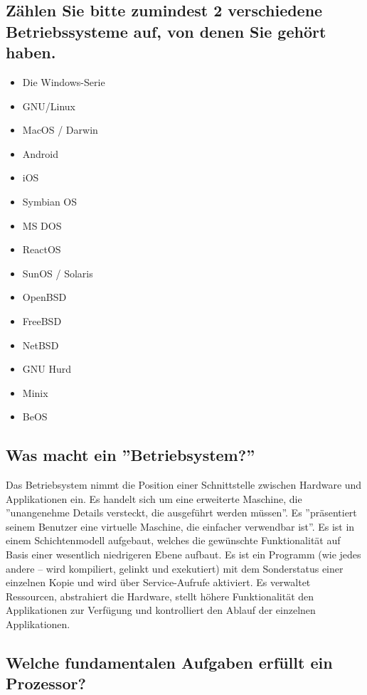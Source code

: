 \subsection{Zählen Sie bitte zumindest 2 verschiedene Betriebssysteme auf,
    von denen Sie gehört haben.}

\begin{itemize}
  \item Die Windows-Serie
  \item GNU/Linux
  \item MacOS / Darwin
  \item Android
  \item iOS
  \item Symbian OS
  \item MS DOS
  \item ReactOS
  \item SunOS / Solaris
  \item OpenBSD
  \item FreeBSD
  \item NetBSD
  \item GNU Hurd
  \item Minix
  \item BeOS
\end{itemize}

\subsection{Was macht ein ''Betriebsystem?''}

Das Betriebsystem nimmt die Position einer Schnittstelle zwischen Hardware
und Applikationen ein. Es handelt sich um eine erweiterte Maschine, die
''unangenehme Details versteckt, die ausgeführt werden müssen''.
Es ''präsentiert seinem Benutzer eine virtuelle Maschine, die einfacher
verwendbar ist''. Es ist in einem Schichtenmodell aufgebaut, welches die
gewünschte Funktionalität auf Basis einer wesentlich niedrigeren Ebene
aufbaut. Es ist ein Programm (wie jedes andere -- wird kompiliert,
gelinkt und exekutiert) mit dem Sonderstatus einer einzelnen Kopie und wird
über Service-Aufrufe aktiviert. Es verwaltet Ressourcen, abstrahiert die
Hardware, stellt höhere Funktionalität den Applikationen zur Verfügung
und kontrolliert den Ablauf der einzelnen Applikationen.

\subsection{Welche fundamentalen Aufgaben erfüllt ein Prozessor?}

